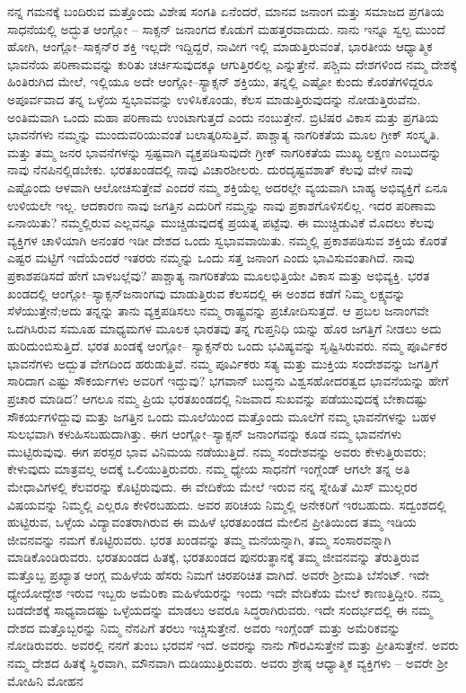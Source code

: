 ನನ್ನ ಗಮನಕ್ಕೆ ಬಂದಿರುವ ಮತ್ತೊಂದು ವಿಶೇಷ ಸಂಗತಿ ಏನೆಂದರೆ, ಮಾನವ ಜನಾಂಗ ಮತ್ತು ಸಮಾಜದ ಪ್ರಗತಿಯ ಸಾಧನೆಯಲ್ಲಿ ಅದ್ಭುತ ಆಂಗ್ಲೋ – ಸಾಕ್ಸನ್​ ಜನಾಂಗದ ಕೊಡುಗೆ ಮಹತ್ತರವಾದುದು. ನಾನು ಇನ್ನೂ ಸ್ವಲ್ಪ ಮುಂದೆ ಹೋಗಿ, ಆಂಗ್ಲೋ–ಸಾಕ್ಸನ್​ರ ಶಕ್ತಿ ಇಲ್ಲದೇ ಇದ್ದಿದ್ದರೆ, ನಾವೀಗ ಇಲ್ಲಿ ಮಾಡುತ್ತಿರುವಂತೆ, ಭಾರತೀಯ ಆಧ್ಯಾತ್ಮಿಕ ಭಾವನೆಯ ಪರಿಣಾಮವನ್ನು ಕುರಿತು ಚರ್ಚಿಸುವುದಕ್ಕೂ ಆಗುತ್ತಿರಲಿಲ್ಲ ಎನ್ನುತ್ತೇನೆ. ಪಶ್ಚಿಮ ದೇಶಗಳಿಂದ ನಮ್ಮ ದೇಶಕ್ಕೆ ಹಿಂತಿರುಗಿದ ಮೇಲೆ, ಇಲ್ಲಿಯೂ ಅದೇ ಆಂಗ್ಲೋ–ಸ್ಯಾಕ್ಸನ್​ ಶಕ್ತಿಯು, ತನ್ನಲ್ಲಿ ಎಷ್ಟೋ ಕುಂದು ಕೊರತೆಗಳಿದ್ದರೂ ಅಪೂರ್ವವಾದ ತನ್ನ ಒಳ್ಳೆಯ ಸ್ವಭಾವವನ್ನು ಉಳಿಸಿಕೊಂಡು, ಕೆಲಸ ಮಾಡುತ್ತಿರುವುದನ್ನು ನೋಡುತ್ತಿರುವೆನು. ಅಂತಿಮವಾಗಿ ಒಂದು ಮಹಾ ಪರಿಣಾಮ ಉಂಟಾಗುತ್ತದೆ ಎಂದು ನಂಬುತ್ತೇನೆ. ಬ್ರಿಟಿಷರ ವಿಕಾಸ ಮತ್ತು ಪ್ರಗತಿಯ ಭಾವನೆಗಳು ನಮ್ಮನ್ನು ಮುಂದುವರಿಯುವಂತೆ ಬಲಾತ್ಕರಿಸುತ್ತಿವೆ. ಪಾಶ್ಚಾತ್ಯ ನಾಗರಿಕತೆಯ ಮೂಲ ಗ್ರೀಕ್​ ಸಂಸ್ಕೃತಿ. ಮತ್ತು ತಮ್ಮ ಜನರ ಭಾವನೆಗಳನ್ನು ಸ್ಪಷ್ಟವಾಗಿ ವ್ಯಕ್ತಪಡಿಸುವುದೇ ಗ್ರೀಕ್​ ನಾಗರಿಕತೆಯ ಮುಖ್ಯ ಲಕ್ಷಣ ಎಂಬುದನ್ನು ನಾವು ನೆನಪಿನಲ್ಲಿಡಬೇಕು. ಭರತಖಂಡದಲ್ಲಿ ನಾವು ವಿಚಾರಶೀಲರು. ದುರದೃಷ್ಟವಶಾತ್​ ಕೆಲವು ವೇಳೆ ನಾವು ಎಷ್ಟೊಂದು ಆಳವಾಗಿ ಆಲೋಚಿಸುತ್ತೇವೆ ಎಂದರೆ ನಮ್ಮ ಶಕ್ತಿಯೆಲ್ಲ ಅದರಲ್ಲೇ ವ್ಯಯವಾಗಿ ಬಾಹ್ಯ ಅಭಿವ್ಯಕ್ತಿಗೆ ಏನೂ ಉಳಿಯಲೇ ಇಲ್ಲ. ಆದಕಾರಣ ನಾವು ಜಗತ್ತಿನ ಎದುರಿಗೆ ನಮ್ಮನ್ನು ನಾವು ಪ್ರಕಾಶಗೊಳಿಸಲಿಲ್ಲ. ಇದರ ಪರಿಣಾಮ ಏನಾಯಿತು? ನಮ್ಮಲ್ಲಿರುವ ಎಲ್ಲವನ್ನೂ ಮುಚ್ಚಿಡುವುದಕ್ಕೆ ಪ್ರಯತ್ನ ಪಟ್ಟೆವು. ಈ ಮುಚ್ಚಿಡುವಿಕೆ ಮೊದಲು ಕೆಲವು ವ್ಯಕ್ತಿಗಳ ಚಾಳಿಯಾಗಿ ಅನಂತರ ಇಡೀ ದೇಶದ ಒಂದು ಸ್ವಭಾವವಾಯಿತು. ನಮ್ಮಲ್ಲಿ ಪ್ರಕಾಶಪಡಿಸುವ ಶಕ್ತಿಯ ಕೊರತೆ ಎಷ್ಟರ ಮಟ್ಟಿಗೆ ಇದೆಯೆಂದರೆ ಇತರರು ನಮ್ಮನ್ನು ಒಂದು ಸತ್ತ ಜನಾಂಗ ಎಂದು ಭಾವಿಸುವಂತಾಗಿದೆ. ನಾವು ಪ್ರಕಾಶಪಡಿಸದೆ ಹೇಗೆ ಬಾಳಬಲ್ಲೆವು? ಪಾಶ್ಚಾತ್ಯ ನಾಗರಿಕತೆಯ ಮೂಲಭಿತ್ತಿಯೇ ವಿಕಾಸ ಮತ್ತು ಅಭಿವ್ಯಕ್ತಿ. ಭರತ ಖಂಡದಲ್ಲಿ ಆಂಗ್ಲೋ–ಸ್ಯಾಕ್ಸನ್​ ಜನಾಂಗವು ಮಾಡುತ್ತಿರುವ ಕೆಲಸದಲ್ಲಿ ಈ ಅಂಶದ ಕಡೆಗೆ ನಿಮ್ಮ ಲಕ್ಷ್ಯವನ್ನು ಸೆಳೆಯುತ್ತೇನೆ;ಅದು ತನ್ನನ್ನು ತಾನು ವ್ಯಕ್ತಪಡಿಸಲು ನಮ್ಮ ರಾಷ್ಟ್ರವನ್ನು ಪ್ರಚೋದಿಸುತ್ತದೆ. ಆ ಪ್ರಬಲ ಜನಾಂಗವೇ ಒದಗಿಸಿರುವ ಸಮೂಹ ಮಾಧ್ಯಮಗಳ ಮೂಲಕ ಭಾರತವು ತನ್ನ ಗುಪ್ತನಿಧಿ ಯನ್ನು ಹೊರ ಜಗತ್ತಿಗೆ ನೀಡಲು ಅದು ಹುರಿದುಂಬಿಸುತ್ತಿದೆ. ಭರತ ಖಂಡಕ್ಕೆ ಆಂಗ್ಲೋ– ಸ್ಯಾಕ್ಸನ್​ರು ಒಂದು ಭವಿಷ್ಯವನ್ನು ಸೃಷ್ಟಿಸಿರುವರು. ನಮ್ಮ ಪೂರ್ವಿಕರ ಭಾವನೆಗಳು ಅದ್ಬುತ ವೇಗದಿಂದ ಹರುಡುತ್ತಿವೆ. ನಮ್ಮ ಪೂರ್ವಿಕರು ಸತ್ಯ ಮತ್ತು ಮುಕ್ತಿಯ ಸಂದೇಶವನ್ನು ಜಗತ್ತಿಗೆ ಸಾರಿದಾಗ ಎಷ್ಟು ಸೌಕರ್ಯಗಳು ಅವರಿಗೆ ಇದ್ದುವು? ಭಗವಾನ್​ ಬುದ್ಧನು ವಿಶ್ವಸಹೋದರತ್ವದ ಭಾವನೆಯನ್ನು ಹೇಗೆ ಪ್ರಚಾರ ಮಾಡಿದ? ಆಗಲೂ ನಮ್ಮ ಪ್ರಿಯ ಭರತಖಂಡದಲ್ಲಿ ನಿಜವಾದ ಸುಖವನ್ನು ಪಡೆಯುವುದಕ್ಕೆ ಬೇಕಾದಷ್ಟು ಸೌಕರ್ಯಗಳಿದ್ದುವು ಮತ್ತು ಜಗತ್ತಿನ ಒಂದು ಮೂಲೆಯಿಂದ ಮತ್ತೊಂದು ಮೂಲೆಗೆ ನಮ್ಮ ಭಾವನೆಗಳನ್ನು ಬಹಳ ಸುಲಭವಾಗಿ ಕಳುಹಿಸಬಹುದಾಗಿತ್ತು. ಈಗ ಆಂಗ್ಲೋ–ಸ್ಯಾಕ್ಸನ್​ ಜನಾಂಗವನ್ನು ಕೂಡ ನಮ್ಮ ಭಾವನೆಗಳು ಮುಟ್ಟಿರುವುವು. ಈಗ ಪರಸ್ಪರ ಭಾವ ವಿನಿಮಯ ನಡೆಯುತ್ತಿದೆ. ನಮ್ಮ ಸಂದೇಶವನ್ನು ಅವರು ಕೇಳುತ್ತಿರುವರು; ಕೇಳುವುದು ಮಾತ್ರವಲ್ಲ ಅದಕ್ಕೆ ಒಲಿಯುತ್ತಿರುವರು. ನಮ್ಮ ಧ್ಯೇಯ ಸಾಧನೆಗೆ ಇಂಗ್ಲೆಂಡ್​ ಆಗಲೇ ತನ್ನ ಅತಿ ಮೇಧಾವಿಗಳಲ್ಲಿ ಕೆಲವರನ್ನು ಕೊಟ್ಟಿರುವುದು. ಈ ವೇದಿಕೆಯ ಮೇಲೆ ಇರುವ ನನ್ನ ಸ್ನೇಹಿತೆ ಮಿಸ್​ ಮುಲ್ಲರರ ವಿಷಯವನ್ನು ನಿಮ್ಮಲ್ಲಿ ಎಲ್ಲರೂ ಕೇಳಿರಬಹುದು. ಅವರ ಪರಿಚಯ ನಿಮ್ಮಲ್ಲಿ ಅನೇಕರಿಗೆ ಇರಬಹುದು. ಸದ್ವಂಶದಲ್ಲಿ ಹುಟ್ಟಿರುವ, ಒಳ್ಳೆಯ ವಿದ್ಯಾವಂತರಾಗಿರುವ ಈ ಮಹಿಳೆ ಭರತಖಂಡದ ಮೇಲಿನ ಪ್ರೀತಿಯಿಂದ ತಮ್ಮ ಇಡಿಯ ಜೀವನವನ್ನು ನಮಗೆ ಕೊಟ್ಟಿರುವರು. ಭರತ ಖಂಡವನ್ನು ತಮ್ಮ ಮನೆಯನ್ನಾಗಿ, ತಮ್ಮ ಸಂಸಾರವನ್ನಾಗಿ ಮಾಡಿಕೊಂಡಿರುವರು. ಭರತಖಂಡದ ಹಿತಕ್ಕೆ, ಭರತಖಂಡದ ಪುನರುತ್ಥಾನಕ್ಕೆ ತಮ್ಮ ಜೀವನವನ್ನು ತೆರುತ್ತಿರುವ ಮತ್ತೊಬ್ಬ ಪ್ರಖ್ಯಾತ ಆಂಗ್ಲ ಮಹಿಳೆಯ ಹೆಸರು ನಿಮಗೆ ಚಿರಪರಿಚಿತ ವಾಗಿದೆ. ಅವರೇ ಶ‍್ರೀಮತಿ ಬೆಸೆಂಟ್​. ಇದೇ ಧ್ಯೇಯೋದ್ದೇಶ ಇರುವ ಇಬ್ಬರು ಅಮೆರಿಕಾ ಮಹಿಳೆಯರನ್ನು ಇಂದು ಇದೇ ವೇದಿಕೆಯ ಮೇಲೆ ಕಾಣುತ್ತಿದ್ದೀರಿ. ನಮ್ಮ ಬಡದೇಶಕ್ಕೆ ಸಾಧ್ಯವಾದಷ್ಟು ಒಳ್ಳೆಯದನ್ನು ಮಾಡಲು ಅವರೂ ಸಿದ್ಧರಾಗಿರುವರು. ಇದೇ ಸಂದರ್ಭದಲ್ಲಿ ಈ ನಮ್ಮ ದೇಶದ ಮತ್ತೊಬ್ಬರನ್ನು ನಿಮ್ಮ ನೆನಪಿಗೆ ತರಲು ಇಚ್ಚಿಸುತ್ತೇನೆ. ಅವರು ಇಂಗ್ಲೆಂಡ್​ ಮತ್ತು ಅಮೆರಿಕವನ್ನು ನೋಡಿರುವರು. ಅವರಲ್ಲಿ ನನಗೆ ತುಂಬ ಭರವಸೆ ಇದೆ. ಅವರನ್ನು ನಾನು ಗೌರವಿಸುತ್ತೇನೆ ಮತ್ತು ಪ್ರೀತಿಸುತ್ತೇನೆ. ಅವರು ನಮ್ಮ ದೇಶದ ಹಿತಕ್ಕೆ ಸ್ಥಿರವಾಗಿ, ಮೌನವಾಗಿ ದುಡಿಯುತ್ತಿರುವರು. ಅವರು ಶ್ರೇಷ್ಠ ಆಧ್ಯಾತ್ಮಿಕ ವ್ಯಕ್ತಿಗಳು – ಅವರೇ ಶ‍್ರೀ ಮೋಹಿನಿ ಮೋಹನ 